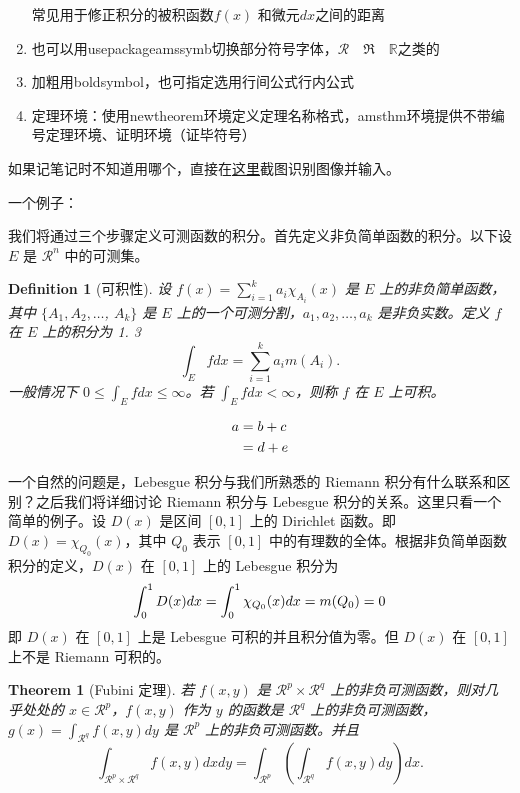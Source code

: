 \documentclass{article}
\newtheorem{theorem}{Theorem}%
\newtheorem{definition}{Definition}
\begin{document}
\begin{enumerate}
常见用于修正积分的被积函数$f(x)$ 和微元$dx$之间的距离
\item 也可以用usepackage{amssymb}切换部分符号字体，$\mathcal{R} \quad \mathfrak{R} \quad \mathbb{R}$之类的
\item 加粗用boldsymbol，也可指定选用行间公式行内公式
\item 定理环境：使用newtheorem环境定义定理名称格式，amsthm环境提供不带编号定理环境、证明环境（证毕符号）
\end{enumerate}

如果记笔记时不知道用哪个，直接在\href{https://www.latexlive.com/home##}{这里}截图识别图像并输入。

一个例子：

我们将通过三个步骤定义可测函数的积分。首先定义非负简单函数的积分。以下设 $E$ 是 $\mathcal{R}^n$ 中的可测集。

\begin{definition}[可积性]
设 $ f(x)=\sum\limits_{i=1}^{k} a_i \chi_{A_i}(x)$ 是 $E$ 上的非负简单函数，其中 $\{A_1,A_2,\ldots$, $A_k\}$ 是 $E$ 上的一个可测分割，$a_1,a_2,\ldots,a_k$ 是非负实数。定义 $f$ 在 $E$ 上的积分为 1. 3
\begin{equation}
   \label{inter}
   \int_{E} f dx = \sum_{i=1}^k a_i m(A_i).   \tag{使用tag自命标签}
\end{equation}
一般情况下 $0 \leq \int_{E} f dx \leq \infty$。若 $\int_{E} f dx < \infty$，则称 $f$ 在 $E$ 上可积。
\end{definition}

\begin{align}
	a & = b + c   \notag  \\
	& = d + e 
\end{align}

一个自然的问题是，Lebesgue 积分与我们所熟悉的 Riemann 积分有什么联系和区别？之后我们将详细讨论 Riemann 积分与 Lebesgue 积分的关系。这里只看一个简单的例子。设 $D(x)$ 是区间 $[0,1]$ 上的 Dirichlet 函数。即 $D(x)=\chi_{Q_0}(x)$，其中 $Q_0$ 表示 $[0,1]$ 中的有理数的全体。根据非负简单函数积分的定义，$D(x)$ 在 $[0,1]$ 上的 Lebesgue 积分为
\begin{equation}\label{inter2}
  \int_0^1 D(x)dx = \int_0^1 \chi_{Q_0} (x) dx = m(Q_0) = 0    \notag
\end{equation}
即 $D(x)$ 在 $[0,1]$ 上是 Lebesgue 可积的并且积分值为零。但 $D(x)$ 在 $[0,1]$ 上不是 Riemann 可积的。


\begin{theorem}[Fubini 定理]\label{thm:fubi}
若 $f(x,y)$ 是 $\mathcal{R}^p\times\mathcal{R}^q$ 上的非负可测函数，则对几乎处处的 $x\in \mathcal{R}^p$，$f(x,y)$ 作为 $y$ 的函数是 $\mathcal{R}^q$ 上的非负可测函数，$g(x)=\int_{\mathcal{R}^q}f(x,y) dy$ 是 $\mathcal{R}^p$ 上的非负可测函数。并且
\begin{equation}\label{eq:461}
  \int_{\mathcal{R}^p\times\mathcal{R}^q} f(x,y) dxdy=\int_{\mathcal{R}^p}\left(\int_{\mathcal{R}^q}f(x,y)dy\right)dx.
\end{equation}
\end{theorem}
\end{document}
